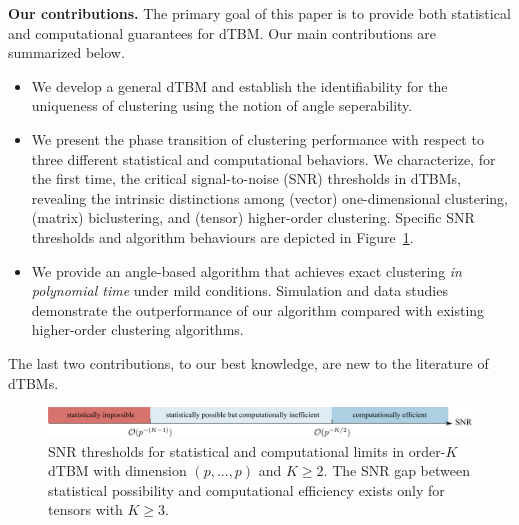 \documentclass[lettersize,onecolumn,journal]{IEEEtran}
\theoremstyle{definition}
\theoremstyle{definition}
\begin{document}
{\bf Our contributions.} The primary goal of this paper is to provide both statistical and computational guarantees for dTBM. Our main contributions are summarized below.
\begin{itemize}[leftmargin=*]

 \item We develop a general dTBM and establish the identifiability for the uniqueness of clustering using the notion of angle seperability.
 
        \item  We present the phase transition of clustering performance with respect to three different statistical and computational behaviors.  We characterize, for the first time, the critical signal-to-noise (SNR) thresholds in dTBMs, revealing the intrinsic distinctions among (vector) one-dimensional clustering, (matrix) biclustering, and (tensor) higher-order clustering. Specific SNR thresholds and algorithm behaviours are depicted in  Figure~\ref{fig:phase_axis}. 
        
    \item We provide an angle-based algorithm that achieves exact clustering \emph{in polynomial time} under mild conditions. Simulation and data studies demonstrate the outperformance of our algorithm compared with existing higher-order clustering algorithms. 
\end{itemize}
The last two contributions, to our best knowledge, are new to the literature of dTBMs. %




\begin{figure}[t]
    \centering
    \includegraphics[width = 17cm]{phase.pdf}
    \caption{SNR thresholds for statistical and computational limits in order-$K$ dTBM with dimension $(p,...,p)$ and $K \geq 2$. The SNR gap between statistical possibility and computational efficiency  exists only for tensors with $K \geq 3$. }
    \label{fig:phase_axis}
\end{figure}
\end{document}
